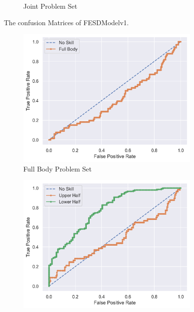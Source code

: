 \begin{figure}[ht]
\begin{subfigure}[b]{0.47\linewidth}
      \caption[]{Joint Problem Set}
      \label{fig:jt_conf_v1}
  \end{subfigure}
  \caption[Confusion Matrices of FESDModelv1]{The confusion Matrices of FESDModelv1.}
  \label{fig:conf_v1}
\end{figure}

\begin{figure}
  \centering
  \begin{subfigure}[b]{0.47\linewidth}
      \centering
      \includegraphics[width=\textwidth]{figures/Results/v1/roc/fb.png}
      \caption[]{Full Body Problem Set}
      \label{fig:fb_roc_v1}
  \end{subfigure}
  \hfill
  \begin{subfigure}[b]{0.47\linewidth}
      \centering
      \includegraphics[width=\textwidth]{figures/Results/v1/roc/hb.png}

\end{subfigure}
\end{figure}
